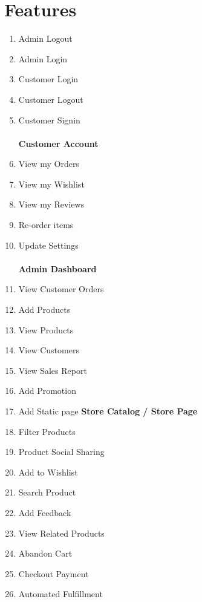 \documentclass{report}
\begin{document}
\section{Features}
\begin{enumerate}
\item Admin Logout
\item Admin Login
\item Customer Login
\item Customer Logout
\item Customer Signin \\ \\
\textbf{Customer Account}
\item View my Orders
\item View my Wishlist
\item View my Reviews
\item Re-order items
\item Update Settings \\ \\
\textbf{Admin Dashboard}
\item View Customer Orders
\item Add Products
\item View Products
\item View Customers
\item View Sales Report
\item Add Promotion 
\item Add Static page
\textbf{Store Catalog / Store Page}
\item Filter Products
\item Product Social Sharing
\item Add to Wishlist
\item Search Product
\item Add Feedback
\item View Related Products
\item Abandon Cart
\item Checkout Payment
\item Automated Fulfillment
\end{enumerate}
\end{document}
